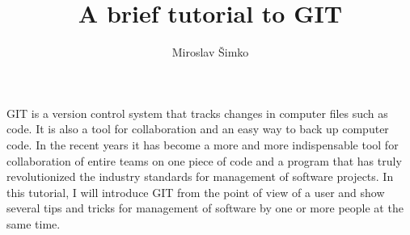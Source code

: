 \documentclass[a4paper,10pt]{article}
\title{A brief tutorial to GIT}
\author{Miroslav Šimko}
\begin{document}
\maketitle

GIT is a version control system that tracks changes in computer files such as code. It is also a tool for collaboration and an easy way to back up computer code. In the recent years it has become a more and more indispensable tool for collaboration of entire teams on one piece of code and a program that has truly revolutionized the industry standards for management of software projects. In this tutorial, I will introduce  
GIT from the point of view of a user and show several tips and tricks for management of software by one or more people at the same time.             
\end{document}
